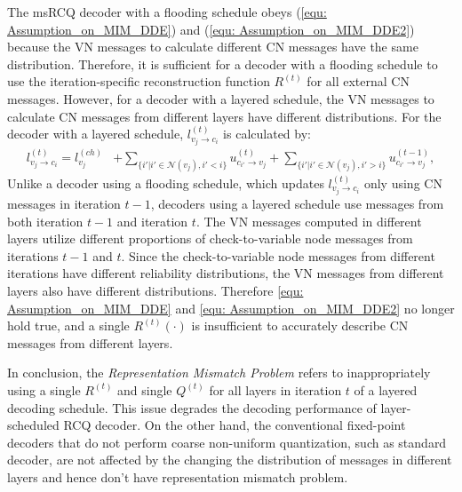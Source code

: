 \documentclass [PhD] {uclathes}
\begin{document}
 The msRCQ decoder with a flooding schedule obeys (\ref{equ: Assumption_on_MIM_DDE}) and (\ref{equ: Assumption_on_MIM_DDE2})  because the VN messages to calculate different CN messages have the same distribution. Therefore, it is sufficient for a decoder with a flooding schedule  to use the iteration-specific reconstruction function  $R^{(t)}$ for all external CN messages. However, for a decoder with a layered schedule, the VN messages to calculate CN messages from different layers have different distributions. For the decoder with a layered schedule, $l^{(t)}_{v_j\rightarrow c_i}$ is calculated by:
\begin{align}\label{equ: vari_update_2}
    l^{(t)}_{v_j\rightarrow c_i} = l^{(ch)}_{v_j}&+ \sum_{\{i'|{i'}\in\mathcal{N}(v_j),i'<i\}}u^{(t)}_{c_{i'}\rightarrow v_{j}}+ \sum_{\{i'|{i'}\in\mathcal{N}(v_j),i'>i\}}u^{(t-1)}_{c_{i'}\rightarrow v_{j}},
\end{align}
Unlike a decoder using a flooding schedule, which updates $ l^{(t)}_{v_j\rightarrow c_i}$ only using CN messages in iteration $t-1$, decoders using a layered schedule use messages from both iteration $t-1$ and iteration $t$. The VN messages computed in different layers utilize different proportions of check-to-variable node messages from iterations $t-1$ and $t$.  Since the check-to-variable node messages from different iterations have different reliability distributions, the VN messages from different layers also have different distributions. Therefore \eqref{equ: Assumption_on_MIM_DDE} and \eqref{equ: Assumption_on_MIM_DDE2} no longer hold true, and a single $R^{(t)}(\cdot)$ is insufficient to accurately describe CN messages from different layers. 

In conclusion, the \textit{Representation Mismatch Problem} refers to inappropriately using a single $R^{(t)}$ and single $Q^{(t)}$ for all layers in iteration $t$  of a layered decoding schedule. This issue degrades the decoding performance of layer-scheduled RCQ decoder.  On the other hand, the conventional fixed-point decoders that do not perform coarse non-uniform quantization, such as standard \minsum decoder,  are not affected by the changing the distribution of messages in different layers and hence don't have representation mismatch problem.
\end{document}
